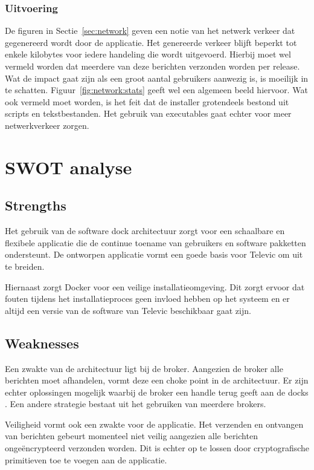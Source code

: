 \subsubsection{Uitvoering}
De figuren in Sectie~\ref{sec:network} geven een notie van het netwerk verkeer dat gegenereerd wordt door de applicatie.
Het genereerde verkeer blijft beperkt tot enkele kilobytes voor iedere handeling die wordt uitgevoerd.
Hierbij moet wel vermeld worden dat meerdere van deze berichten verzonden worden per release.
Wat de impact gaat zijn als een groot aantal gebruikers aanwezig is, is moeilijk in te schatten.
Figuur~\ref{fig:network:stats} geeft wel een algemeen beeld hiervoor.
Wat ook vermeld moet worden, is het feit dat de installer grotendeels bestond uit scripts en tekstbestanden.
Het gebruik van executables gaat echter voor meer netwerkverkeer zorgen.

\section{SWOT analyse}
\subsection{Strengths}
Het gebruik van de software dock architectuur zorgt voor een schaalbare en flexibele applicatie die de continue toename van gebruikers en software pakketten ondersteunt.
De ontworpen applicatie vormt een goede basis voor Televic om uit te breiden.

Hiernaast zorgt Docker voor een veilige installatieomgeving.
Dit zorgt ervoor dat fouten tijdens het installatieproces geen invloed hebben op het systeem en er altijd een versie van de software van Televic beschikbaar gaat zijn.

\subsection{Weaknesses}
Een zwakte van de architectuur ligt bij de broker.
Aangezien de broker alle berichten moet afhandelen, vormt deze een choke point in de architectuur.
Er zijn echter oplossingen mogelijk waarbij de broker een handle terug geeft aan de docks \citep{adler1995distributed}. 
Een andere strategie bestaat uit het gebruiken van meerdere brokers.

Veiligheid vormt ook een zwakte voor de applicatie.
Het verzenden en ontvangen van berichten gebeurt momenteel niet veilig aangezien alle berichten ongeëncrypteerd verzonden worden.
Dit is echter op te lossen door cryptografische primitieven toe te voegen aan de applicatie.

